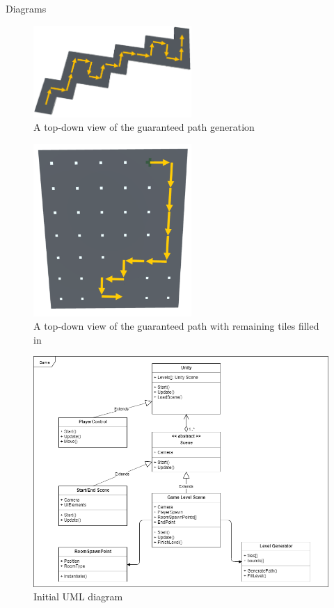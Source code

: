 \documentclass[progress]{cmpreport}
\begin{document}
\begin{section}{Diagrams}

\begin{figure}[H]
    \includegraphics[width=6cm]{img/1-maze.png}
    \caption{A top-down view of the guaranteed path generation}
    \label{fig:pathgen}
\end{figure}

\begin{figure}[H]
    \includegraphics[width=6cm]{img/filled-path.png}
    \caption{A top-down view of the guaranteed path with remaining tiles filled in}
    \label{fig:filledpath}
\end{figure}



\begin{figure}[H]
    \includegraphics[width=\textwidth]{img/uml1.png}
    \caption{Initial UML diagram}
    \label{fig:uml1}
\end{figure}


\end{section}
\end{document}
